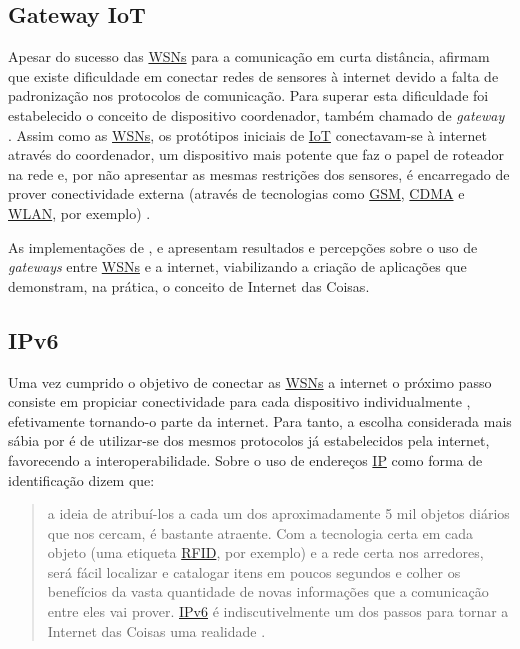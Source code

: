 \documentclass[twoside,english,brazilian]{UNISINOSmonografia}
\begin{document}
\subsection{Gateway IoT}
	Apesar do sucesso das \hyperref[siglas]{WSNs} para a comunicação em curta distância, 
	 afirmam que existe dificuldade 
	em conectar redes de sensores à internet devido a falta de padronização 
	nos protocolos de comunicação. Para superar esta dificuldade foi 
	estabelecido o conceito de dispositivo coordenador, também chamado de 
	\textit{gateway} \cite{Steenkamp2009}. 
	Assim como as \hyperref[siglas]{WSNs}, os protótipos iniciais de \hyperref[siglas]{IoT} conectavam-se à internet 
	através do coordenador, um dispositivo mais potente que faz o papel de 
	roteador na rede \cite{Kuryla2010} e, por não apresentar as mesmas 
	restrições dos sensores, é encarregado de prover 
	conectividade externa (através de 
	tecnologias como \hyperref[siglas]{GSM}, \hyperref[siglas]{CDMA} e \hyperref[siglas]{WLAN}, por exemplo) \cite{Liu2012}.
	
	As implementações de ,  e 
	 apresentam resultados e percepções sobre o uso de 
	\textit{gateways} entre \hyperref[siglas]{WSNs} e a internet, viabilizando a criação de 
	aplicações que demonstram, na prática, o conceito de Internet das Coisas.

\subsection{IPv6}
	Uma vez cumprido o objetivo de conectar as \hyperref[siglas]{WSNs} a internet o próximo passo 
	consiste em propiciar conectividade para cada dispositivo individualmente 
	\cite{Atzori2010b}, efetivamente tornando-o parte da internet.
	Para tanto, a escolha considerada mais sábia por  
	é de utilizar-se dos mesmos protocolos já estabelecidos pela internet, 
	favorecendo a interoperabilidade.
	Sobre o uso de endereços \hyperref[siglas]{IP} como forma de 
	identificação  dizem que:
	\begin{quote}
		a ideia de atribuí-los a cada um dos aproximadamente 5 
		mil objetos diários que nos cercam, é bastante atraente.
		Com a tecnologia certa em cada objeto (uma etiqueta \hyperref[siglas]{RFID}, por exemplo) 
		e a rede certa nos arredores, será fácil localizar e catalogar itens 
		em poucos segundos e colher os benefícios da vasta quantidade de novas 
		informações que a comunicação entre eles vai prover. \hyperref[siglas]{IPv6} é 
		indiscutivelmente um dos passos para tornar a Internet das Coisas uma 
		realidade
		\cite[p.~15]{Sundmaeker2010}.
	\end{quote}
	
\end{document}
